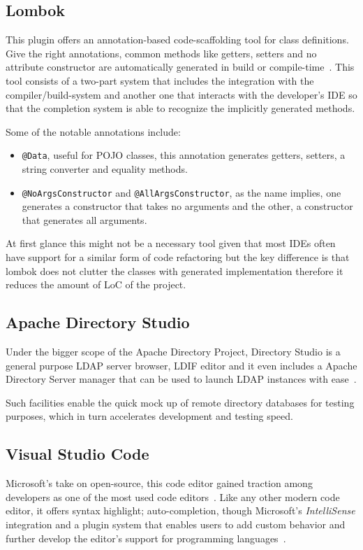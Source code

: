 \subsection{Lombok}
This plugin offers an annotation-based code-scaffolding tool for class definitions. Give the right annotations, common methods like getters, setters and no attribute constructor are automatically generated in build or compile-time~\cite{lombok}. This tool consists of a two-part system that includes the integration with the compiler/build-system and another one that interacts with the developer's \gls{IDE} so that the completion system is able to recognize the implicitly generated methods.

Some of the notable annotations include:
\begin{itemize}
\item \texttt{@Data}, useful for \gls{POJO} classes, this annotation generates getters, setters, a string converter and equality methods.
\item \texttt{@NoArgsConstructor} and \texttt{@AllArgsConstructor}, as the name implies, one generates a constructor that takes no arguments and the other, a constructor that generates all arguments.
\end{itemize}

At first glance this might not be a necessary tool given that most \gls{IDE}s often have support for a similar form of code refactoring but the key difference is that lombok does not clutter the classes with generated implementation therefore it reduces the amount of \gls{LoC} of the project.

\subsection{Apache Directory Studio}\label{ads}
Under the bigger scope of the Apache Directory Project, Directory Studio is a general purpose \gls{LDAP} server browser, \gls{LDIF} editor and it even includes a Apache Directory Server manager that can be used to launch \gls{LDAP} instances with ease~\cite{apacheds}.

Such facilities enable the quick mock up of remote directory databases for testing purposes, which in turn accelerates development and testing speed.

\subsection{Visual Studio Code}
Microsoft's take on open-source, this code editor gained traction among developers as one of the most used code editors~\cite{vscodesurvey}. Like any other modern code editor, it offers syntax highlight; auto-completion, though Microsoft's \textit{IntelliSense} integration and a plugin system that enables users to add custom behavior and further develop the editor's support for programming languages~\cite{vscode}.

